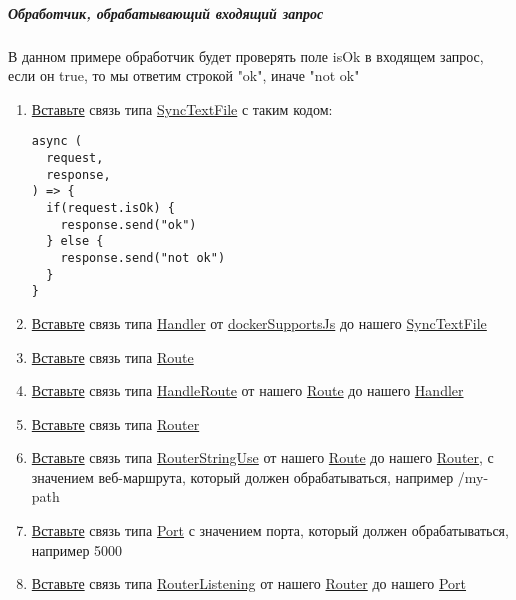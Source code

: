 \subparagraph{Обработчик, обрабатывающий входящий запрос}
В данном примере обработчик будет проверять поле isOk в входящем запрос, если
он true, то мы ответим строкой "ok", иначе "not ok"
\begin{enumerate}
  \item \hyperlink{DeepCase.InsertLink.Description}{Вставьте} связь типа
        \hyperlink{Core.SyncTextFile.Description}{SyncTextFile} с таким
        кодом:
        \begin{lstlisting}
async (
  request,
  response,
) => {
  if(request.isOk) {
    response.send("ok")
  } else {
    response.send("not ok")
  }
}
\end{lstlisting}
  \item \hyperlink{DeepCase.InsertLink.Description}{Вставьте} связь типа
        \hyperlink{Core.Handler.Description}{Handler} от
        \hyperlink{Core.dockerSupportsJs.Description}{dockerSupportsJs}
        до нашего \hyperlink{Core.SyncTextFile.Description}{SyncTextFile}
  \item \hyperlink{DeepCase.InsertLink.Description}{Вставьте} связь типа
        \hyperlink{Core.Route.Description}{Route}
  \item \hyperlink{DeepCase.InsertLink.Description}{Вставьте} связь типа
        \hyperlink{Core.HandleRoute.Description}{HandleRoute} от нашего
        \hyperlink{Core.Route.Description}{Route} до нашего
        \hyperlink{Core.Handler.Description}{Handler}
  \item \hyperlink{DeepCase.InsertLink.Description}{Вставьте} связь типа
        \hyperlink{Core.Router.Description}{Router}
  \item \hyperlink{DeepCase.InsertLink.Description}{Вставьте} связь типа
        \hyperlink{Core.RouterStringUse.Description}{RouterStringUse} от
        нашего
        \hyperlink{Core.Route.Description}{Route} до нашего
        \hyperlink{Core.Router.Description}{Router},
        с
        значением
        веб-маршрута, который должен обрабатываться, например /my-path
  \item \hyperlink{DeepCase.InsertLink.Description}{Вставьте} связь типа
        \hyperlink{Core.Port.Description}{Port} с значением порта, который
        должен
        обрабатываться, например
        5000
  \item \hyperlink{DeepCase.InsertLink.Description}{Вставьте} связь типа
        \hyperlink{Core.RouterListening.Description}{RouterListening} от
        нашего
        \hyperlink{Core.Router.Description}{Router} до нашего
        \hyperlink{Core.Port.Description}{Port}
\end{enumerate}

